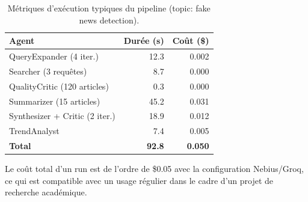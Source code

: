 \begin{table}[htbp]
  \centering
  \caption{Métriques d'exécution typiques du pipeline (topic: fake news detection).}
  \label{tab:pipeline_demo}
  \begin{tabular}{lrr}
    \toprule
    \textbf{Agent} & \textbf{Durée (s)} & \textbf{Coût (\$)} \\
    \midrule
    QueryExpander (4 iter.) & 12.3 & 0.002 \\
    Searcher (3 requêtes) & 8.7 & 0.000 \\
    QualityCritic (120 articles) & 0.3 & 0.000 \\
    Summarizer (15 articles) & 45.2 & 0.031 \\
    Synthesizer + Critic (2 iter.) & 18.9 & 0.012 \\
    TrendAnalyst & 7.4 & 0.005 \\
    \midrule
    \textbf{Total} & \textbf{92.8} & \textbf{0.050} \\
    \bottomrule
  \end{tabular}
\end{table}

Le coût total d'un run est de l'ordre de \$0.05 avec la configuration
Nebius/Groq, ce qui est compatible avec un usage régulier dans le cadre
d'un projet de recherche académique.
